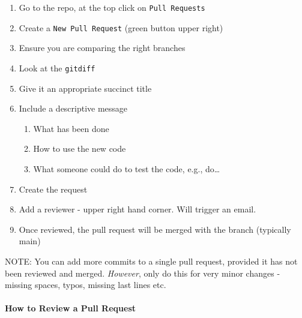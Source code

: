 \documentclass[
  letterpaper,
  DIV=11,
  numbers=noendperiod]{scrreprt}
\let\oldparagraph\paragraph
\renewcommand{\paragraph}[1]{\oldparagraph{#1}\mbox{}}
\providecommand{\tightlist}{%
  \setlength{\itemsep}{0pt}\setlength{\parskip}{0pt}}\usepackage{longtable,booktabs,array}
\begin{document}
\begin{enumerate}
\def\labelenumi{\arabic{enumi}.}
\tightlist
\item
  Go to the repo, at the top click on \texttt{Pull\ Requests}\\
\item
  Create a \texttt{New\ Pull\ Request} (green button upper right)\\
\item
  Ensure you are comparing the right branches\\
\item
  Look at the \texttt{gitdiff}\\
\item
  Give it an appropriate succinct title\\
\item
  Include a descriptive message

  \begin{enumerate}
  \def\labelenumii{\alph{enumii}.}
  \tightlist
  \item
    What has been done\\
  \item
    How to use the new code\\
  \item
    What someone could do to test the code, e.g., do\ldots{}\\
  \end{enumerate}
\item
  Create the request\\
\item
  Add a reviewer - upper right hand corner. Will trigger an email.\\
\item
  Once reviewed, the pull request will be merged with the branch
  (typically main)
\end{enumerate}

NOTE: You can add more commits to a single pull request, provided it has
not been reviewed and merged. \emph{However}, only do this for very
minor changes - missing spaces, typos, missing last lines etc.

\paragraph{How to Review a Pull
Request}\label{how-to-review-a-pull-request}
\end{document}
